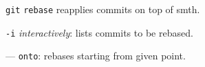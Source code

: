 %

\begin{compactenum}
\item [\texttt{git}] \texttt{rebase} reapplies commits on top of smth.
\item [\texttt{-i}] \emph{interactively}: lists commits to be rebased.
\item [---] \texttt{onto}: rebases starting from given point.
\end{compactenum}

%
